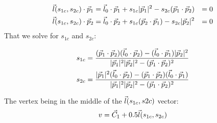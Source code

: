 \documentclass{article}
\begin{document}
\begin{align}
	\vec{l}(s_{1c},s_{2c})\cdot\vec{p}_{1} &= \vec{l}_{0}\cdot\vec{p}_{1} + s_{1c}|\vec{p}_{1}|^2 -
	s_{2c}(\vec{p}_{1}\cdot\vec{p}_{2}) &= 0
	\\
	\vec{l}(s_{1c},s_{2c})\cdot\vec{p}_{2} &= \vec{l}_{0}\cdot\vec{p}_{2} + s_{1c}(\vec{p}_{2}\cdot\vec{p}_{1}) -
	s_{2c}|\vec{p}_{2}|^2 &= 0
\end{align}
That we solve for $s_{1c}$ and $s_{2c}$:

\begin{align}
	s_{1c} &= \frac{(\vec{p}_{1}\cdot\vec{p}_{2})(\vec{l}_{0}\cdot\vec{p}_{2}) -
	(\vec{l}_{0}\cdot\vec{p}_{1})|\vec{p}_{2}|^2}{|\vec{p}_{1}|^2|\vec{p}_{2}|^2 - (\vec{p}_{1}\cdot\vec{p}_{2})^2}\\
	s_{2c} &= \frac{|\vec{p}_{1}|^2(\vec{l}_{0}\cdot\vec{p}_{2}) -
	(\vec{p}_{1}\cdot\vec{p}_{2})(\vec{l}_{0}\cdot\vec{p}_{1})}{|\vec{p}_{1}|^2|\vec{p}_{2}|^2 - (\vec{p}_{1}\cdot\vec{p}_{2})^2}
\end{align}

The vertex being in the middle of the $\vec{l}(s_{1c},s{2c})$ vector:
\begin{equation}
	v = \vec{C}_{1} + 0.5\vec{l}(s_{1c},s_{2c})
\end{equation}
\end{document}
